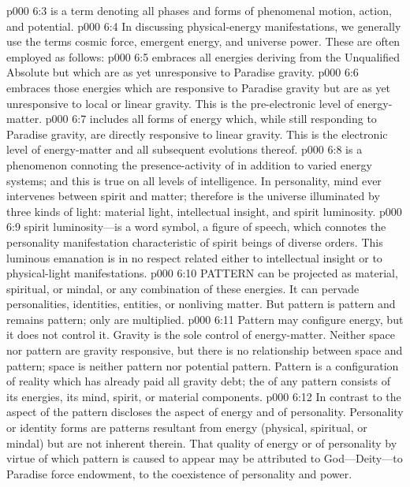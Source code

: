 \pc \vs p000 6:3  is a term denoting all phases and forms of phenomenal motion, action, and potential.
\vs p000 6:4 In discussing physical\hyp{}energy manifestations, we generally use the terms cosmic force, emergent energy, and universe power. These are often employed as follows:
\pc \vs p000 6:5 \bibnobreakspace {} embraces all energies deriving from the Unqualified Absolute but which are as yet unresponsive to Paradise gravity.
\vs p000 6:6 \bibnobreakspace {} embraces those energies which are responsive to Paradise gravity but are as yet unresponsive to local or linear gravity. This is the pre\hyp{}electronic level of energy\hyp{}matter.
\vs p000 6:7 \bibnobreakspace {} includes all forms of energy which, while still responding to Paradise gravity, are directly responsive to linear gravity. This is the electronic level of energy\hyp{}matter and all subsequent evolutions thereof.
\pc \vs p000 6:8  is a phenomenon connoting the presence\hyp{}activity of  in addition to varied energy systems; and this is true on all levels of intelligence. In personality, mind ever intervenes between spirit and matter; therefore is the universe illuminated by three kinds of light: material light, intellectual insight, and spirit luminosity.
\pc \vs p000 6:9 spirit luminosity---is a word symbol, a figure of speech, which connotes the personality manifestation characteristic of spirit beings of diverse orders. This luminous emanation is in no respect related either to intellectual insight or to physical\hyp{}light manifestations.
\pc \vs p000 6:10 PATTERN can be projected as material, spiritual, or mindal, or any combination of these energies. It can pervade personalities, identities, entities, or nonliving matter. But pattern is pattern and remains pattern; only  are multiplied.
\vs p000 6:11 Pattern may configure energy, but it does not control it. Gravity is the sole control of energy\hyp{}matter. Neither space nor pattern are gravity responsive, but there is no relationship between space and pattern; space is neither pattern nor potential pattern. Pattern is a configuration of reality which has already paid all gravity debt; the  of any pattern consists of its energies, its mind, spirit, or material components.
\vs p000 6:12 In contrast to the aspect of the  pattern discloses the  aspect of energy and of personality. Personality or identity forms are patterns resultant from energy (physical, spiritual, or mindal) but are not inherent therein. That quality of energy or of personality by virtue of which pattern is caused to appear may be attributed to God---Deity---to Paradise force endowment, to the coexistence of personality and power.
